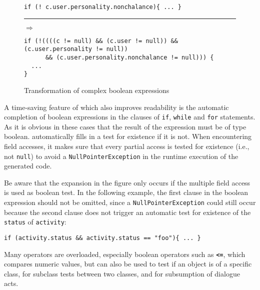 \begin{figure}[htbp]
  \begin{small}
\begin{minipage}{.55\textwidth}
\begin{lstlisting}
if (! c.user.personality.nonchalance){ ... }
\end{lstlisting}
\end{minipage}\rule{2cm}{0pt}{\LARGE$\Rightarrow$}\hfill\\
\begin{lstlisting}
if (!((((c != null) && (c.user != null)) && (c.user.personality != null))
      && (c.user.personality.nonchalance != null))) {
  ...
}
\end{lstlisting}\end{small}\vspace*{-2ex}
\caption{\label{tab:multi-predaccess}Transformation of complex boolean expressions}

\end{figure}
\vspace*{10pt}

A time-saving feature of \vonda which also improves readability is the
automatic completion of boolean expressions in the clauses of \texttt{if},
\texttt{while} and \texttt{for} statements. As it is obvious in these cases
that the result of the expression must be of type boolean. \vonda automatically
fills in a test for existence if it is not. When encountering field accesses,
it makes sure that every partial access is tested for existence (i.e., not
\texttt{null}) to avoid a \texttt{NullPointerException} in the runtime
execution of the generated code.

Be aware that the expansion in the figure only occurs if the multiple field
access is used as boolean test. In the following example, the first clause in
the boolean expression should not be omitted, since a
\texttt{NullPointerException} could still occur because the second clause does
not trigger an automatic test for existence of the \texttt{status} of
\texttt{activity}:

\begin{lstlisting}
if (activity.status && activity.status == "foo"){ ... }
\end{lstlisting}

Many operators are overloaded, especially boolean operators such as
\textbf{\texttt{<=}}, which compares numeric values, but can also be used to
test if an object is of a specific class, for subclass tests between two
classes, and for subsumption of dialogue acts.

